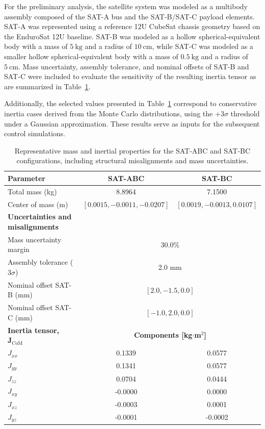 For the preliminary analysis, the satellite system was modeled as a multibody assembly composed of the SAT-A bus and the SAT-B/SAT-C payload elements. SAT-A was represented using a reference 12U CubeSat chassis geometry based on the EnduroSat 12U baseline. SAT-B was modeled as a hollow spherical-equivalent body with a mass of \(5~\mathrm{kg}\) and a radius of \(10~\mathrm{cm}\), while SAT-C was modeled as a smaller hollow spherical-equivalent body with a mass of \(0.5~\mathrm{kg}\) and a radius of \(5~\mathrm{cm}\).  Mass uncertainty, assembly tolerance, and nominal offsets of SAT-B and SAT-C were included to evaluate the sensitivity of the resulting inertia tensor as are summarized in Table~\ref{tab:adcs_inertia_properties}.

Additionally, the selected values presented in Table~\ref{tab:adcs_inertia_properties} correspond to conservative inertia cases derived from the Monte Carlo distributions, using the $+3\sigma$ threshold under a Gaussian approximation. These results serve as inputs for the subsequent control simulations.

\begin{table}[ht]
\centering
\caption{Representative mass and inertial properties for the SAT-ABC and SAT-BC configurations, including structural misalignments and mass uncertainties.}
\label{tab:adcs_inertia_properties}
\begin{tabular}{lcc}
\hline
\textbf{Parameter} & \textbf{SAT-ABC} & \textbf{SAT-BC} \\ \hline
Total mass (kg) & 8.8964 & 7.1500 \\
Center of mass (m) & $[0.0015, -0.0011, -0.0207]$ & $[0.0019, -0.0013, 0.0107]$ \\ \hline
\textbf{Uncertainties and misalignments} & \multicolumn{2}{c}{} \\ \hline
Mass uncertainty margin & \multicolumn{2}{c}{30.0\%} \\
Assembly tolerance ($3\sigma$) & \multicolumn{2}{c}{2.0 mm} \\
Nominal offset SAT-B (mm) & \multicolumn{2}{c}{$[2.0, -1.5, 0.0]$} \\
Nominal offset SAT-C (mm) & \multicolumn{2}{c}{$[-1.0, 2.0, 0.0]$} \\ \hline
\textbf{Inertia tensor, $\mathbf{J}_{\mathrm{CoM}}$} & \multicolumn{2}{c}{\textbf{Components [kg$\cdot$m$^2$]}} \\ \hline
$J_{xx}$ & 0.1339 & 0.0577 \\
$J_{yy}$ & 0.1341 & 0.0577 \\
$J_{zz}$ & 0.0704 & 0.0444 \\
$J_{xy}$ & -0.0000 & 0.0000 \\
$J_{xz}$ & -0.0003 & 0.0001 \\
$J_{yz}$ & -0.0001 & -0.0002 \\ \hline
\end{tabular}
\end{table}

